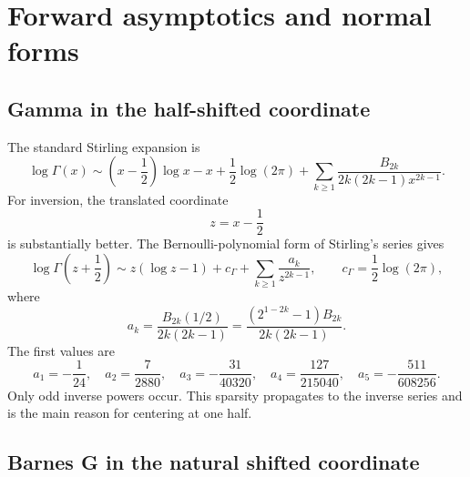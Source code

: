 \documentclass[11pt,a4paper]{article}
\numberwithin{equation}{section}
\theoremstyle{definition}
\theoremstyle{remark}
\begin{document}
\section{Forward asymptotics and normal forms}

\subsection{Gamma in the half-shifted coordinate}

The standard Stirling expansion is~\cite{DLMFGamma,Olver}
\begin{equation}
 \log\Gamma(x)\sim
 \left(x-\frac12\right)\log x-x+\frac12\log(2\pi)
 +\sum_{k\ge1}\frac{B_{2k}}{2k(2k-1)x^{2k-1}}.
 \label{eq:stirling-standard}
\end{equation}
For inversion, the translated coordinate
\begin{equation}
 z=x-\frac12
 \label{eq:gamma-center}
\end{equation}
is substantially better.  The Bernoulli-polynomial form of Stirling's
series gives
\begin{equation}
 \log\Gamma\!\left(z+\frac12\right)
 \sim z(\log z-1)+c_\Gamma
 +\sum_{k\ge1}\frac{a_k}{z^{2k-1}},
 \qquad c_\Gamma=\frac12\log(2\pi),
 \label{eq:gamma-centered}
\end{equation}
where
\begin{equation}
 a_k=\frac{B_{2k}(1/2)}{2k(2k-1)}
 =\frac{(2^{1-2k}-1)B_{2k}}{2k(2k-1)}.
 \label{eq:ak-def}
\end{equation}
The first values are
\begin{equation}
 a_1=-\frac1{24},\quad
 a_2=\frac7{2880},\quad
 a_3=-\frac{31}{40320},\quad
 a_4=\frac{127}{215040},\quad
 a_5=-\frac{511}{608256}.
 \label{eq:ak-first}
\end{equation}
Only odd inverse powers occur.  This sparsity propagates to the inverse
series and is the main reason for centering at one half.

\subsection{Barnes G in the natural shifted coordinate}
\end{document}
